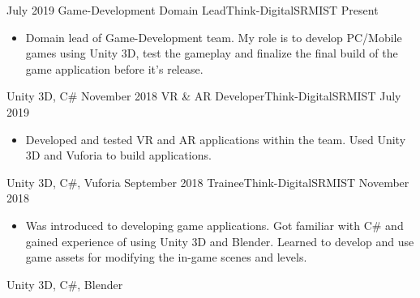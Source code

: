 %
%
%
\begin{experiences}
  \experience
    {July 2019}   {Game-Development Domain Lead}{Think-Digital}{SRMIST}
    {Present} {
                      \begin{itemize}
                        \item Domain lead of Game-Development team. My role is to develop PC/Mobile games using Unity 3D, test the gameplay and finalize the final build of the game application before it's release.               
                                   
                                                                                       
                      \end{itemize}
                    }
                    {Unity 3D, C\#}
  \emptySeparator
\experience
    {November 2018}   {VR \& AR Developer}{Think-Digital}{SRMIST}
    {July 2019} {
                      \begin{itemize}
                        \item Developed and tested VR and AR applications within the team. Used Unity 3D and Vuforia to build applications.               
                                   
                                                                                       
                      \end{itemize}
                    }
                    {Unity 3D, C\#, Vuforia}
  \emptySeparator
  \experience
    {September 2018}     {Trainee}{Think-Digital}{SRMIST}
    {November 2018}    {
                      \begin{itemize}
                        \item Was introduced to developing game applications. Got familiar with C\# and gained experience of using Unity 3D and Blender. Learned to develop and use game assets for modifying the in-game scenes and levels.
               
                              
                      \end{itemize}
                    }
                    {Unity 3D, C\#, Blender}

\end{experiences}